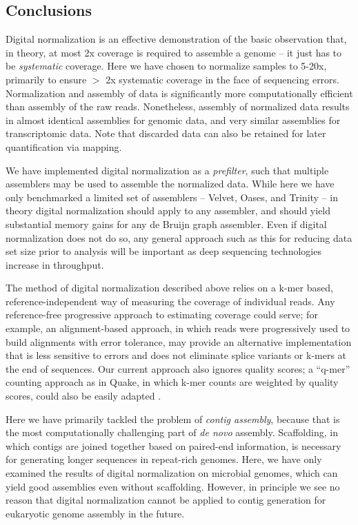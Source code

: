 \documentclass[10pt]{article}
\begin{document}

\subsection*{Conclusions}

Digital normalization is an effective demonstration of the basic
observation that, in theory, at most 2x coverage is required to
assemble a genome -- it just has to be {\em systematic} coverage.
Here we have chosen to normalize samples to 5-20x, primarily to ensure
$>$ 2x systematic coverage in the face of sequencing errors.
Normalization and assembly of data is significantly more
computationally efficient than assembly of the raw reads.
Nonetheless, assembly of normalized data results in almost identical
assemblies for genomic data, and very similar assemblies for
transcriptomic data.  Note that discarded data can also be retained
for later quantification via mapping.

We have implemented digital normalization as a {\em prefilter}, such
that multiple assemblers may be used to assemble the normalized data.
While here we have only benchmarked a limited set of assemblers --
Velvet, Oases, and Trinity -- in theory digital normalization should
apply to any assembler, and should yield substantial memory gains for
any de Bruijn graph assembler.  Even if digital normalization does not
do so, any general approach such as this for reducing data set size
prior to analysis will be important as deep sequencing technologies
increase in throughput.

The method of digital normalization described above relies on a k-mer
based, reference-independent way of measuring the coverage of
individual reads.  Any reference-free progressive approach to
estimating coverage could serve; for example, an alignment-based
approach, in which reads were progressively used to build alignments
with error tolerance, may provide an alternative implementation that
is less sensitive to errors and does not eliminate splice variants or
k-mers at the end of sequences.  Our current approach also ignores
quality scores; a ``q-mer'' counting approach as in Quake, in which
k-mer counts are weighted by quality scores, could also be easily
adapted \cite{pubmed21114842}.

Here we have primarily tackled the problem of {\em contig assembly},
because that is the most computationally challenging part of {\em de
  novo} assembly.  Scaffolding, in which contigs are joined together
based on paired-end information, is necessary for generating longer
sequences in repeat-rich genomes.  Here, we have only examined the
results of digital normalization on microbial genomes, which can yield
good assemblies even without scaffolding.  However, in principle we
see no reason that digital normalization cannot be applied to contig
generation for eukaryotic genome assembly in the future.
\end{document}
